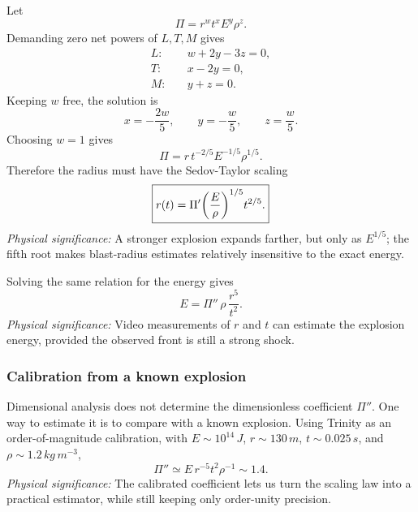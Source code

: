 Let
\begin{equation*}
    \Pi=r^w t^x E^y \rho^z .
\end{equation*}
Demanding zero net powers of $L,T,M$ gives
\begin{align}
    L:\quad & w+2y-3z=0, \nonumber\\
    T:\quad & x-2y=0, \nonumber\\
    M:\quad & y+z=0 .
    \label{eq:lec05:blast-exponent-equations}
\end{align}
Keeping $w$ free, the solution is
\begin{equation}
    x=-\frac{2w}{5},\qquad y=-\frac{w}{5},\qquad z=\frac{w}{5}.
    \label{eq:lec05:blast-exponent-solution}
\end{equation}
Choosing $w=1$ gives
\begin{equation}
    \Pi = r\,t^{-2/5}E^{-1/5}\rho^{1/5}.
    \label{eq:lec05:blast-pi}
\end{equation}
Therefore the radius must have the Sedov-Taylor scaling
\begin{equation}
    \boxed{
    r(t)=\Pi'\qty(\frac{E}{\rho})^{1/5}t^{2/5}.
    }
    \label{eq:lec05:sedov-radius}
\end{equation}
\textit{Physical significance:} A stronger explosion expands farther, but only
as $E^{1/5}$; the fifth root makes blast-radius estimates relatively
insensitive to the exact energy.

Solving the same relation for the energy gives
\begin{equation}
    \boxed{
    E=\Pi''\,\rho\,\frac{r^5}{t^2}.
    }
    \label{eq:lec05:sedov-energy}
\end{equation}
\textit{Physical significance:} Video measurements of $r$ and $t$ can estimate
the explosion energy, provided the observed front is still a strong shock.

\subsubsection*{Calibration from a known explosion}
Dimensional analysis does not determine the dimensionless coefficient
$\Pi''$. One way to estimate it is to compare with a known explosion. Using
Trinity as an order-of-magnitude calibration, with $E\sim10^{14}\,\si{J}$,
$r\sim130\,\si{m}$, $t\sim0.025\,\si{s}$, and
$\rho\sim1.2\,\si{kg\,m^{-3}}$,
\begin{equation}
    \boxed{
    \Pi'' \simeq E\,r^{-5}t^2\rho^{-1}\sim 1.4 .
    }
    \label{eq:lec05:blast-calibration}
\end{equation}
\textit{Physical significance:} The calibrated coefficient lets us turn the
scaling law into a practical estimator, while still keeping only order-unity
precision.

